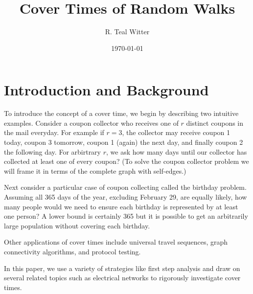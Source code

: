 \documentclass[12pt]{article}
\theoremstyle{definition}
\begin{document}
\title{Cover Times of Random Walks}


\author{R. Teal Witter}

\date{\today}



\maketitle


\newpage
\tableofcontents

\newpage
\section{Introduction and Background}\label{sec:intro}

To introduce the concept of a cover time, we begin by describing two intuitive examples.
Consider a coupon collector who receives one of $r$ distinct coupons
in the mail everyday.
For example if $r=3$, the collector may receive coupon 1 today, coupon 3 tomorrow,
coupon 1 (again) the next day, and finally coupon 2 the following day.
For arbirtrary $r$, we ask how many days until our 
collector has collected at least one of every coupon?
(To solve the coupon collector problem we will frame it in terms 
of the complete graph with self-edges.)

Next consider a particular case of coupon collecting called the birthday problem.
Assuming all 365 days of the year, excluding February 29, are equally likely,
how many people would we need to ensure each birthday is represented
by at least one person?
A lower bound is certainly 365 but it is possible to get an arbitrarily
large population without covering each birthday.

Other applications of cover times include universal travel sequences,
graph connectivity algorithms, and protocol testing.

In this paper, we use a variety of strategies like first step analysis
and draw on several related topics such as electrical networks to rigorously
investigate cover times.
\end{document}
